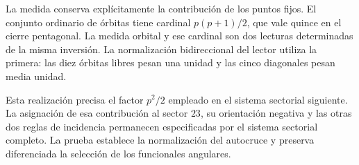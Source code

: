La medida conserva explícitamente la contribución de los puntos fijos.
El conjunto ordinario de órbitas tiene cardinal $p(p+1)/2$, que vale
quince en el cierre pentagonal. La medida orbital y ese cardinal son
dos lecturas determinadas de la misma inversión. La normalización
bidireccional del lector utiliza la primera: las diez órbitas libres
pesan una unidad y las cinco diagonales pesan media unidad.

Esta realización precisa el factor $p^2/2$ empleado en el sistema
sectorial siguiente. La asignación de esa contribución al sector $23$,
su orientación negativa y las otras dos reglas de incidencia permanecen
especificadas por el sistema sectorial completo. La prueba establece la
normalización del autocruce y preserva diferenciada la selección de los
funcionales angulares.
